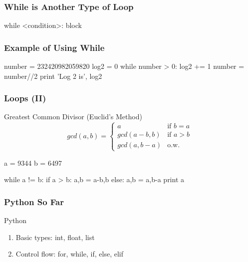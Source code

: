 \begin{frame}[fragile]
\frametitle{While is Another Type of Loop}
\begin{python}
while <condition>:
    block
\end{python}

\end{frame}

\begin{frame}[fragile]
\frametitle{Example of Using While}

\begin{python}
number = 232420982059820
log2 = 0
while number > 0:
    log2 += 1
    number = number//2
print 'Log 2 is', log2
\end{python}

\end{frame}

\begin{frame}[fragile]
\frametitle{Loops (II)}

\begin{block}{Greatest Common Divisor (Euclid's Method)}
\[
gcd(a,b) = \begin{cases}
            a & \text{if $b = a$}\\
            gcd(a-b, b) & \text{if $a > b$} \\
            gcd(a, b-a) & \text{o.w.}
            \end{cases}
\]
\end{block}

\pause
\begin{python}
a = 9344
b = 6497

while a != b:
    if a > b:
        a,b = a-b,b
    else:
        a,b = a,b-a
print a
\end{python}

\end{frame}

\begin{frame}[fragile]
\frametitle{Python So Far}

\begin{block}{Python}
\begin{enumerate}
\item Basic types: int, float, list
\item Control flow: for, while, if, else, elif
\end{enumerate}
\end{block}

\end{frame}


